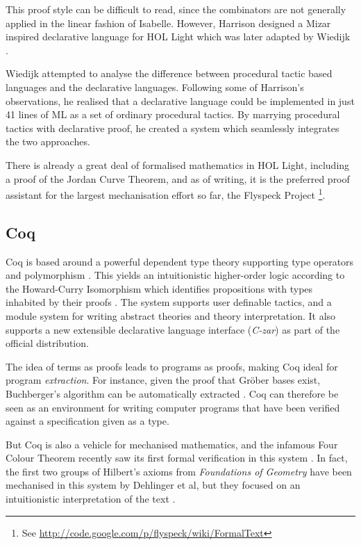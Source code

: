 This proof style can be difficult to read, since the combinators are not generally applied in the linear fashion of Isabelle. However, Harrison designed a Mizar inspired declarative language for HOL Light \cite{MizarHOL} which was later adapted by Wiedijk \cite{MizarLight}. 

Wiedijk attempted to analyse the difference between procedural tactic based languages and the declarative languages. Following some of Harrison's observations, he realised that a declarative language could be implemented in just 41 lines of ML as a set of ordinary procedural tactics. By marrying procedural tactics with declarative proof, he created a system which seamlessly integrates the two approaches. 

There is already a great deal of formalised mathematics in HOL Light, including a proof of the Jordan Curve Theorem, and as of writing, it is the preferred proof assistant for the largest mechanisation effort so far, the Flyspeck Project \cite{flyspeck}\footnote{See \url{http://code.google.com/p/flyspeck/wiki/FormalText}}. 

\subsection{Coq}
Coq is based around a powerful dependent type theory supporting type operators and polymorphism \cite{Coq}. This yields an intuitionistic higher-order logic according to the Howard-Curry Isomorphism which identifies propositions with types inhabited by their proofs \cite{CalculusOfConstructions}. The system supports user definable tactics, and a module system for writing abstract theories and theory interpretation. It also supports a new extensible declarative language interface (\emph{C-zar}) as part of the official distribution.

The idea of terms as proofs leads to programs as proofs, making Coq ideal for program \emph{extraction}. For instance, given the proof that Gr\"{o}ber bases exist, Buchberger's algorithm can be automatically extracted \cite{CoqGrobner}. Coq can therefore be seen as an environment for writing computer programs that have been verified against a specification given as a type. 

But Coq is also a vehicle for mechanised mathematics, and the infamous Four Colour Theorem recently saw its first formal verification in this system \cite{GonthierFCT}. In fact, the first two groups of Hilbert's axioms from \emph{Foundations of Geometry} have been mechanised in this system by Dehlinger et al, but they focused on an intuitionistic interpretation of the text \cite{DehlingerFOG}. 


